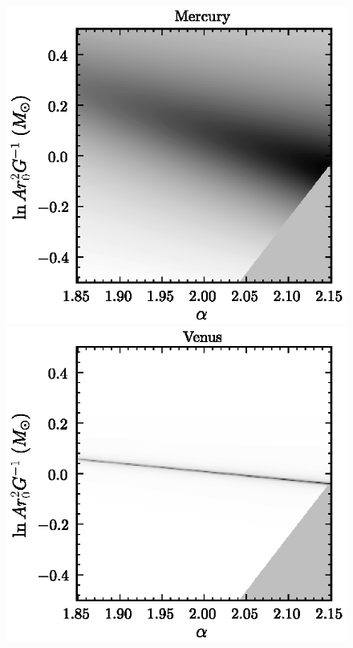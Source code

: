 \clearpage
\begin{figure}
\includegraphics[height=.2\textheight]{figs_solarsystem/jacobian_Mercury.ps}
\includegraphics[height=.2\textheight]{figs_solarsystem/jacobian_Venus.ps}\\[5pt]

\end{figure}
